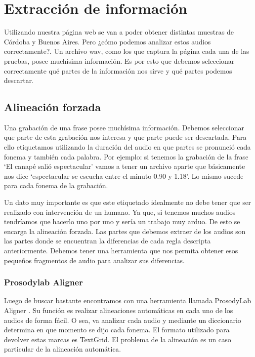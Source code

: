\chapter{Extracción de información}

Utilizando nuestra página web se van a poder obtener distintas muestras de Córdoba y Buenos Aires. Pero ¿cómo podemos analizar estos audios correctamente?. Un archivo wav, como los que captura la página cada una de las pruebas, posee muchísima información. Es por esto que debemos seleccionar correctamente qué partes de la información nos sirve y qué partes podemos descartar. 

\section{Alineación forzada}

Una grabación de una frase posee muchísima información. Debemos seleccionar que parte de esta grabación nos interesa y que parte puede ser descartada. Para ello etiquetamos utilizando la duración del audio en que partes se pronunció cada fonema y también cada palabra. Por ejemplo: si tenemos la grabación de la frase `El canapé salió espectacular’ vamos a tener un archivo aparte que básicamente nos dice `espectacular se escucha entre el minuto 0.90 y 1.18’. Lo mismo sucede para cada fonema de la grabación.

Un dato muy importante es que este etiquetado idealmente no debe tener que ser realizado con intervención de un humano. Ya que, si tenemos muchos audios tendríamos que hacerlo uno por uno y sería un trabajo muy arduo. De esto se encarga la alineación forzada. Las partes que debemos extraer de los audios son las partes donde se encuentran la diferencias de cada regla descripta anteriormente. Debemos tener una herramienta que nos permita obtener esos pequeños fragmentos de audio para analizar sus diferencias. 

\subsection{Prosodylab Aligner}


Luego de buscar bastante encontramos con una herramienta llamada ProsodyLab Aligner \cite{prosodylab}. Su función es realizar alineaciones automáticas en cada uno de los audios de forma fácil. O sea, va analizar cada audio y mediante un diccionario determina en que momento se dijo cada fonema. El formato utilizado para devolver estas marcas es TextGrid. El problema de la alineación es un caso particular de la alineación automática.


